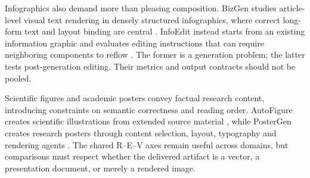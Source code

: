 Infographics also demand more than pleasing composition. BizGen studies article-level visual text rendering in densely structured infographics, where correct long-form text and layout binding are central \citep{bizgen2025}. InfoEdit instead starts from an existing information graphic and evaluates editing instructions that can require neighboring components to reflow \citep{yang2026infoedit}. The former is a generation problem; the latter tests post-generation editing. Their metrics and output contracts should not be pooled.

Scientific figures and academic posters convey factual research content, introducing constraints on semantic correctness and reading order. AutoFigure creates scientific illustrations from extended source material \citep{autofigure2026}, while PosterGen creates research posters through content selection, layout, typography and rendering agents \citep{postergen2026}. The shared R--E--V axes remain useful across domains, but comparisons must respect whether the delivered artifact is a vector, a presentation document, or merely a rendered image.

